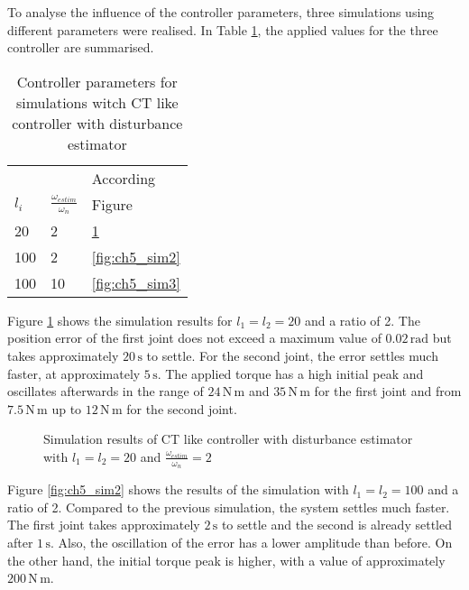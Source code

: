 To analyse the influence of the controller parameters, three simulations using different parameters were realised. In Table \ref{tab:ch5_distesti}, the applied values for the three controller are summarised.
\begin{table}[H]
	\begin{center}
		\caption{Controller parameters for simulations witch CT like controller with disturbance estimator}
		\label{tab:ch5_distesti}
		\begin{tabular}{lll}
			      &                                   & According          \\
			$l_i$ & $\frac{\omega_{estim}}{\omega_n}$ & Figure             \\
			\midrule
			20    & 2                                 & \ref{fig:ch5_sim1} \\
			100   & 2                                 & \ref{fig:ch5_sim2} \\
			100   & 10                                & \ref{fig:ch5_sim3} \\
			\bottomrule
		\end{tabular}
	\end{center}
\end{table}
Figure \ref{fig:ch5_sim1} shows the simulation results for $l_1 = l_2 = 20$ and a ratio of 2. The position error of the first joint does not exceed a maximum value of $0.02\,\mathrm{rad}$ but takes approximately $20\,\mathrm{s}$ to settle. For the second joint, the error settles much faster, at approximately $5\,\mathrm{s}$. The applied torque has a high initial peak and oscillates afterwards in the range of $24\,\mathrm{N\,m}$ and $35\,\mathrm{N\,m}$ for the first joint and from $7.5\,\mathrm{N\,m}$ up to $12\,\mathrm{N\,m}$ for the second joint.
\begin{figure}[H]
	\centering
	
	\caption{Simulation results of CT like controller with disturbance estimator with $l_1 = l_2 = 20$ and $\frac{\omega_{estim}}{\omega_n} = 2$}
	\label{fig:ch5_sim1}
\end{figure}
Figure \ref{fig:ch5_sim2} shows the results of the simulation with $l_1 = l_2 = 100$ and a ratio of 2. Compared to the previous simulation, the system settles much faster. The first joint takes approximately $2\,\mathrm{s}$ to settle and the second is already settled after $1\,\mathrm{s}$. Also, the oscillation of the error has a lower amplitude than before. On the other hand, the initial torque peak is higher, with a value of approximately $200\,\mathrm{N\,m}$.\\
